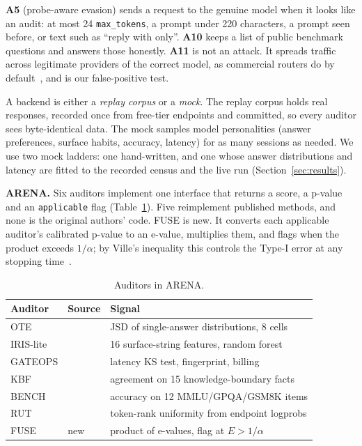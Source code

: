 \textbf{A5} (probe-aware evasion) sends a request to the genuine model when it looks like an audit:
at most 24 \texttt{max\_tokens}, a prompt under 220 characters,
a prompt seen before, or text such as ``reply with only''. \textbf{A10} keeps a list of public
benchmark questions and answers those honestly. \textbf{A11} is not an attack. It spreads traffic
across legitimate providers of the correct model, as commercial routers do by
default~\cite{openrouter_exacto}, and is our false-positive test.

A backend is either a \emph{replay corpus} or a \emph{mock}. The replay corpus holds real responses,
recorded once from free-tier endpoints and committed, so every auditor sees byte-identical data.
The mock samples model personalities (answer preferences, surface habits, accuracy, latency) for as
many sessions as needed. We use two mock ladders: one hand-written, and one whose answer
distributions and latency are fitted to the recorded census and the live run
(Section~\ref{sec:results}).

\textbf{ARENA.} Six auditors implement one interface that returns a score, a p-value and an
\texttt{applicable} flag (Table~\ref{tab:auditors}). Five reimplement published methods, and none
is the original authors' code. FUSE is new. It converts each applicable auditor's calibrated
p-value to an e-value, multiplies them, and flags when the product exceeds $1/\alpha$; by Ville's
inequality this controls the Type-I error at any stopping time~\cite{vovk2021evalues,ville1939}.

\begin{table}[t]
\centering
\caption{Auditors in ARENA.}
\label{tab:auditors}
\small
\setlength{\tabcolsep}{4pt}
\begin{tabular}{@{}lll@{}}
\toprule
Auditor & Source & Signal \\
\midrule
OTE & \cite{bruckner2026} & JSD of single-answer distributions, 8 cells \\
IRIS-lite & \cite{iris2026} & 16 surface-string features, random forest \\
GATEOPS & \cite{lin2026gatescope} & latency KS test, fingerprint, billing \\
KBF & \cite{fang2026kbf} & agreement on 15 knowledge-boundary facts \\
BENCH & \cite{cai2025} & accuracy on 12 MMLU/GPQA/GSM8K items \\
RUT & \cite{zhu2025rut} & token-rank uniformity from endpoint logprobs \\
FUSE & new & product of e-values, flag at $E > 1/\alpha$ \\
\bottomrule
\end{tabular}
\end{table}

